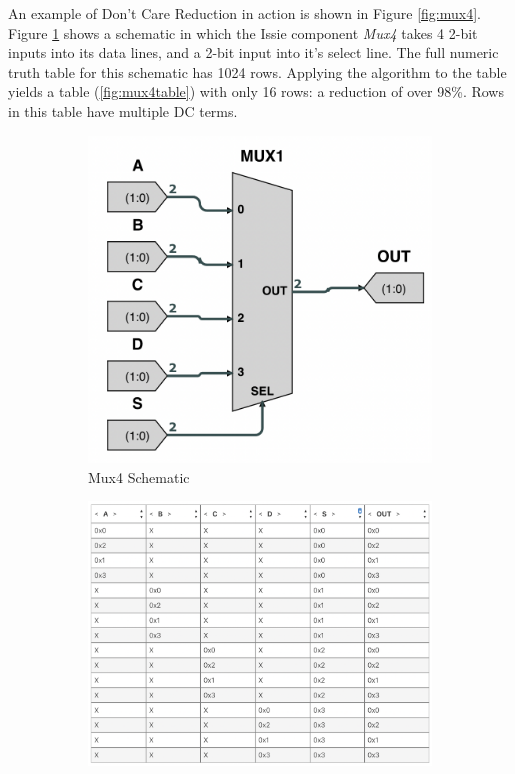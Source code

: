 An example of Don't Care Reduction in action is shown in Figure \ref{fig:mux4}. Figure \ref{fig:mux4schematic} shows a schematic in which the Issie component \textit{Mux4} takes 4 2-bit inputs into its data lines, and a 2-bit input into it's select line. The full numeric truth table for this schematic has 1024 rows. Applying the algorithm to the table yields a table (\ref{fig:mux4table}) with only 16 rows: a reduction of over 98\%. Rows in this table have multiple DC terms.

\begin{figure}
     \centering
     \begin{subfigure}[b]{0.45\textwidth}
         \centering
         \includegraphics[width=\textwidth]{05.ImpPlan/mux4.png}
         \caption{Mux4 Schematic}
         \label{fig:mux4schematic}
     \end{subfigure}
     \begin{subfigure}[b]{0.45\textwidth}
         \centering
         \includegraphics[width=\textwidth]{05.ImpPlan/mux4table.png}

\end{subfigure}
\end{figure}
